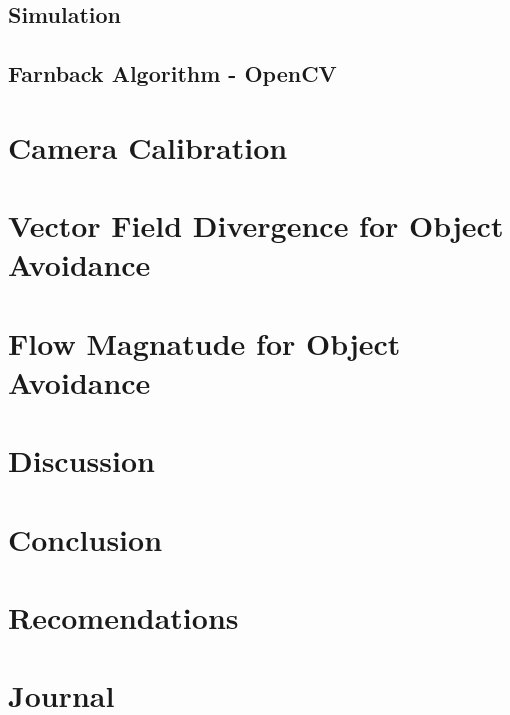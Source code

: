 \documentclass{UoNMCHA}
\numberwithin{equation}{section}
\begin{document}
\subsection{Simulation}
\subsection{Farnback Algorithm - OpenCV}

\newpage
\section{Camera Calibration}

\newpage
\section{Vector Field Divergence for Object Avoidance}

\newpage
\section{Flow Magnatude for Object Avoidance}

\newpage
\section{Discussion}

\newpage
\section{Conclusion}\label{sec:Conclusion}

\newpage
\section{Recomendations}

\newpage


\appendix
\newpage
\section{Journal}\label{app:Journal}
\end{document}
